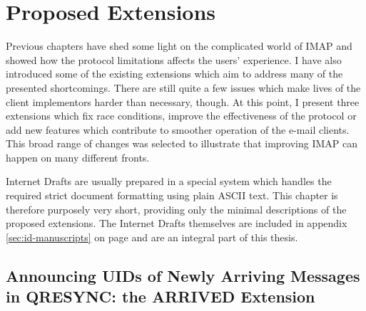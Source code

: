 \documentclass[trojita]{subfiles}
\begin{document}
\chapter{Proposed Extensions}

Previous chapters have shed some light on the complicated world of IMAP and showed how the protocol limitations affects
the users' experience.  I have also introduced some of the existing extensions which aim to address many of the
presented shortcomings.  There are still quite a few issues which make lives of the client implementors harder than
necessary, though.  At this point, I present three extensions which fix race conditions, improve the effectiveness of
the protocol or add new features which contribute to smoother operation of the e-mail clients.  This broad range of
changes was selected to illustrate that improving IMAP can happen on many different fronts.

Internet Drafts are usually prepared in a special system \cite{rfc-formatting} which handles the required strict
document formatting using plain ASCII text.  This chapter is therefore purposely very short, providing only the minimal
descriptions of the proposed extensions.  The Internet Drafts themselves are included in appendix
\ref{sec:id-manuscripts} on page \pageref{sec:id-manuscripts} and are an integral part of this thesis.

\section{Announcing UIDs of Newly Arriving Messages in QRESYNC: the ARRIVED Extension}
\label{sec:draft-arrived}
\end{document}
